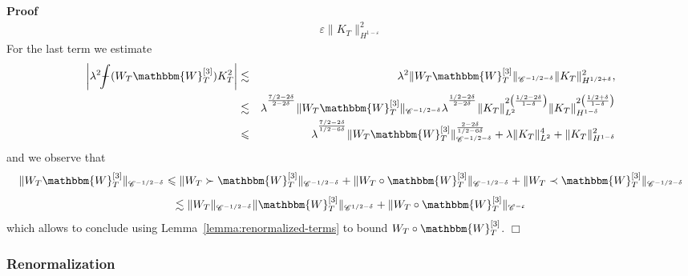 \documentclass[11pt, oneside]{article}   	%
\newenvironment{proof}{\noindent\textbf{Proof\ }}{\hspace*{\fill}$\Box$\medskip}
\def\Xint#1{\mathchoice
{\XXint\displaystyle\textstyle{#1}}%
{\XXint\textstyle\scriptstyle{#1}}%
{\XXint\scriptstyle\scriptscriptstyle{#1}}%
{\XXint\scriptscriptstyle\scriptscriptstyle{#1}}%
\!\int}
\def\XXint#1#2#3{{\setbox0=\hbox{$#1{#2#3}{\int}$ }
\vcenter{\hbox{$#2#3$ }}\kern-.6\wd0}}
\def\dashint{\Xint-}
\newcommand{\bint}{\dashint}
\newcommand{\VV}{\mathscr{C}}
\begin{document}
\begin{proof}
\[\begin{array}{lll}
       \varepsilon \| K_T \|^2_{H^{1 - \varepsilon}}
     \end{array} \]
  For the last term we estimate
  \begin{eqnarray*}
    \left| \lambda^2 \bint (W_T \mathbbm{W}_T^{[3]}) K^2_T \right| & \lesssim
    & \lambda^2 \| W_T \mathbbm{W}_T^{[3]} \|_{\VV^{- 1 / 2 - \delta}} \| K_T
    \|^2_{H^{1 / 2 + \delta}},\\
    & \lesssim & \lambda^{^{\frac{7 / 2 - 2 \delta}{2 - 2 \delta}}} \| W_T
    \mathbbm{W}_T^{[3]} \|_{\VV^{- 1 / 2 - \delta}} \lambda^{^{\frac{1 / 2 - 2
    \delta}{2 - 2 \delta}}} \| K_T \|^{2 \left( \frac{1 / 2 - 2 \delta}{1 -
    \delta} \right)}_{L^2} \| K_T \|^{2 \left( \frac{1 / 2 + \delta}{1 -
    \delta} \right)}_{H^{1 - \delta}}\\
    & \leqslant & \lambda^{^{\frac{7 / 2 - 2 \delta}{1 / 2 - 6 \delta}}} \|
    W_T \mathbbm{W}_T^{[3]} \|^{\frac{2 - 2 \delta}{1 / 2 - 6 \delta}}_{\VV^{-
    1 / 2 - \delta}} + \lambda \| K_T \|^4_{L^2} + \| K_T \|^2_{H^{1 -
    \delta}}
  \end{eqnarray*}
  and we observe that
  \[ \| W_T \mathbbm{W}_T^{[3]} \|_{\VV^{- 1 / 2 - \delta}} \leqslant \| W_T
     \succ \mathbbm{W}_T^{[3]} \|_{\VV^{- 1 / 2 - \delta}} + \| W_T \circ
     \mathbbm{W}_T^{[3]} \|_{\VV^{- 1 / 2 - \delta}} + \| W_T \prec
     \mathbbm{W}_T^{[3]} \|_{\VV^{- 1 / 2 - \delta}} \]
  \[ \lesssim \| W_T \|_{\VV^{- 1 / 2 - \delta}} \| \mathbbm{W}_T^{[3]}
     \|_{\VV^{1 / 2 - \delta}} + \| W_T \circ \mathbbm{W}_T^{[3]} \|_{\VV^{-
     \varepsilon}} \]
  which allows to conclude using Lemma~\ref{lemma:renormalized-terms} to bound
  $W_T \circ \mathbbm{W}_T^{[3]}$.
\end{proof}

\subsubsection{Renormalization}
\end{document}
